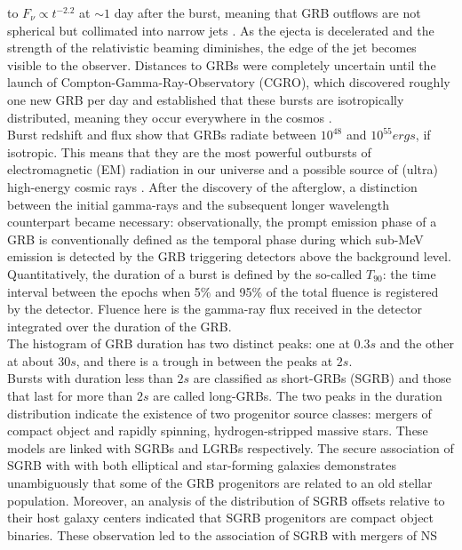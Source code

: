 \documentclass[binding=0.6cm, LaM]{sapthesis}
\begin{document}
	to $F_{\nu} \propto t^{−2.2}$ at $\sim 1$ day after the burst, meaning that GRB outflows 
	are not spherical but collimated into narrow jets \cite{183}. 
	As the ejecta is decelerated and the strength of the relativistic beaming diminishes, 
	the edge of the jet becomes visible to the observer. 
	Distances to GRBs were completely uncertain until the launch of Compton-Gamma-Ray-Observatory (CGRO),  	
	which discovered roughly one new GRB per day and established that these bursts 
	are isotropically distributed, meaning they occur everywhere in the cosmos \cite{184}.\\
	Burst redshift and flux show that GRBs radiate between $10^48$ and $10^55 ergs$, if isotropic.
	This means that they are the most powerful outbursts of electromagnetic (EM) radiation in our universe 
	and a possible source of (ultra) high-energy cosmic rays \cite{185,186}. 
	After the discovery of the afterglow, a distinction between the initial gamma-rays 
	and the subsequent longer wavelength counterpart became necessary: 
	observationally, the prompt emission phase of a GRB is conventionally defined 
	as the temporal phase during which sub-MeV emission is detected by 
	the GRB triggering detectors above the background level. \\
	Quantitatively, the duration of a burst is defined by the so-called $T_90$: 
	the time interval between the epochs when 5\% and 95\% of the total fluence is registered by the detector. 
	Fluence here is the gamma-ray flux received in the detector integrated over the duration of the GRB. \\
	The histogram of GRB duration has two distinct peaks:
	one at $0.3s$ and the other at about $30s$, and there is a trough in between the peaks at $2s$. \\
	Bursts with duration less than $2s$ are classified as short-GRBs (SGRB) 
	and those that last for more than $2s$ are called long-GRBs.
	The two peaks in the duration distribution indicate the existence of 
	two progenitor source classes: mergers of compact object
	and rapidly spinning, hydrogen-stripped massive stars. 
	These models are linked with SGRBs and LGRBs respectively. 
	The secure association of SGRB with with both elliptical and star-forming galaxies
	demonstrates unambiguously that some of the GRB progenitors are related to an old stellar population. 
	Moreover, an analysis of the distribution of SGRB offsets relative to their 
	host galaxy centers indicated that SGRB progenitors are compact object binaries. 
	These observation led to the association of SGRB with mergers of NS 
\end{document}
